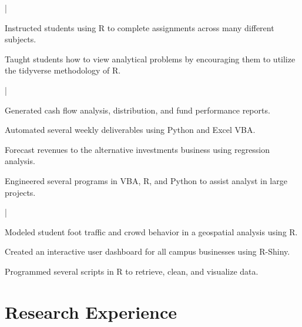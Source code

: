 \message{ !name(cv_12 copy.tex)}\documentclass[letterpaper]{deedy-resume}
\begin{document}
\begin{minipage}[t]{0.65\textwidth}
 |
\begin{tightitemize}
  \item Instructed students using R to complete assignments across many different subjects. \\
  \item Taught students how to view analytical problems by encouraging them to utilize the tidyverse methodology of R. \\
\end{tightitemize}

\sectionspace 

 |
\begin{tightitemize}
  \item Generated cash flow analysis, distribution, and fund performance reports.\\
  \item Automated several weekly deliverables using Python and Excel VBA. \\
  \item Forecast revenues to the alternative investments business using regression analysis. \\
  \item Engineered several programs in VBA, R, and Python to assist analyst in large projects.
\end{tightitemize}

\sectionspace 

 |
\begin{tightitemize}
\item Modeled student foot traffic and crowd behavior in a geospatial analysis using R. \\
\item Created an interactive user dashboard for all campus businesses using R-Shiny. \\
\item Programmed several scripts in R to retrieve, clean, and visualize data.
\end{tightitemize}

\sectionspace
    
\section{Research Experience}


\end{minipage}
\end{document}
